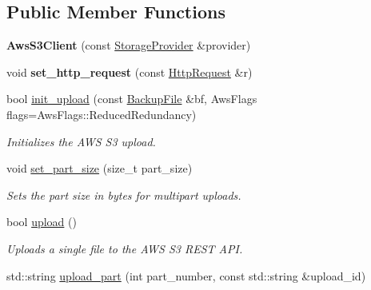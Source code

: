 \subsection*{Public Member Functions}
\begin{DoxyCompactItemize}
\item 
\mbox{\label{class_vessel_1_1_networking_1_1_aws_s3_client_a298d769b7ef2478a29eb7289039e67e2}} 
{\bfseries Aws\+S3\+Client} (const \hyperlink{struct_vessel_1_1_types_1_1_storage_provider}{Storage\+Provider} \&provider)
\item 
\mbox{\label{class_vessel_1_1_networking_1_1_aws_s3_client_a50dc6763024104c359dfca61ae3e2f90}} 
void {\bfseries set\+\_\+http\+\_\+request} (const \hyperlink{class_vessel_1_1_networking_1_1_http_request}{Http\+Request} \&r)
\item 
bool \hyperlink{class_vessel_1_1_networking_1_1_aws_s3_client_a2e08698221d54ca88ac5055d991eb21f}{init\+\_\+upload} (const \hyperlink{class_vessel_1_1_file_1_1_backup_file}{Backup\+File} \&bf, Aws\+Flags flags=Aws\+Flags\+::\+Reduced\+Redundancy)
\begin{DoxyCompactList}\small\item\em Initializes the A\+WS S3 upload. \end{DoxyCompactList}\item 
\mbox{\label{class_vessel_1_1_networking_1_1_aws_s3_client_ab9e7eb4b95cece8a1283d12d9e72b55c}} 
void \hyperlink{class_vessel_1_1_networking_1_1_aws_s3_client_ab9e7eb4b95cece8a1283d12d9e72b55c}{set\+\_\+part\+\_\+size} (size\+\_\+t part\+\_\+size)
\begin{DoxyCompactList}\small\item\em Sets the part size in bytes for multipart uploads. \end{DoxyCompactList}\item 
bool \hyperlink{class_vessel_1_1_networking_1_1_aws_s3_client_ae78ce420213ab93e81b6fee0911c4746}{upload} ()
\begin{DoxyCompactList}\small\item\em Uploads a single file to the A\+WS S3 R\+E\+ST A\+PI. \end{DoxyCompactList}\item 
std\+::string \hyperlink{class_vessel_1_1_networking_1_1_aws_s3_client_a2588b9b6a22ea6610e4a4eddec2973de}{upload\+\_\+part} (int part\+\_\+number, const std\+::string \&upload\+\_\+id)

\end{DoxyCompactItemize}
